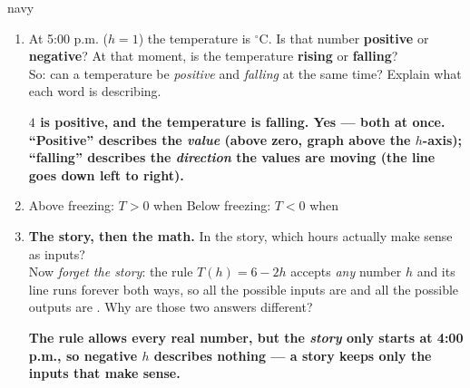\documentclass[12pt]{article}
\newcommand{\answerspace}[2]{\par\nopagebreak\noindent\begin{minipage}[t][#1][t]{\linewidth}%
  \color{keyred}\bfseries #2\end{minipage}\par}
\begin{document}
\begin{scenariobox}{navy}
\begin{enumerate}[label=\textbf{\alph*.}, start=3, leftmargin=1.8em, itemsep=5pt]
  \item At 5:00 p.m. ($h=1$) the temperature is  $^\circ$C. Is that number
        \textbf{positive} or \textbf{negative}? At that moment, is the temperature \textbf{rising}
        or \textbf{falling}? \\[4pt]
        So: can a temperature be \emph{positive} and \emph{falling} at the same time? Explain
        what each word is describing.
        \answerspace{2.2cm}{$4$ is positive, and the temperature is falling. Yes --- both at once. ``Positive'' describes the \emph{value} (above zero, graph above the $h$-axis); ``falling'' describes the \emph{direction} the values are moving (the line goes down left to right).}
  \item Above freezing: $T>0$ when  \qquad
        Below freezing: $T<0$ when 
  \item \textbf{The story, then the math.} In the story, which hours actually make sense as
        inputs?  \\[2pt]
        Now \emph{forget the story}: the rule $T(h) = 6 - 2h$ accepts \emph{any} number $h$ and its
        line runs forever both ways, so all the possible inputs are  and all
        the possible outputs are . Why are those two answers different?
        \answerspace{1.5cm}{The rule allows every real number, but the \emph{story} only starts at 4:00 p.m., so negative $h$ describes nothing --- a story keeps only the inputs that make sense.}
\end{enumerate}
\end{scenariobox}
\end{document}
